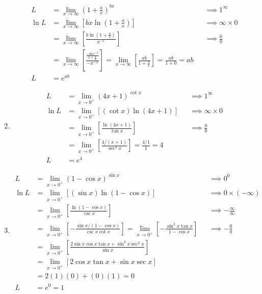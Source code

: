 \documentclass[12pt, A4]{report}
\begin{document}
\begin{enumerate}
\begin{align*}
						L &= \lim_{x\to\infty}\left(1 + \frac{a}{x}\right)^{bx}
								&&\implies 1^{\infty} \\
						\ln L &= \lim_{x\to\infty}\left[bx\ln\left(1 + \frac{a}{x}\right)\right]
								&&\implies \infty \times 0 \\
							&= \lim_{x\to\infty}\left[\frac{b\ln\left(1 + \frac{a}{x}\right)}{x^{-1}}\right]
								&&\implies \frac{0}{0} \\
							&= \lim_{x\to\infty}\left[\frac{\frac{-bax^{-2}}{1 + \frac{a}{x}}}{-x^{-2}}\right] 
								= \lim_{x\to\infty}\left[\frac{ab}{1 + \frac{a}{x}}\right] 
								= \frac{ab}{1 + 0} = ab \\
						L &= e^{ab}
					\end{align*}
				\item
					\begin{align*}
						L &= \lim_{x\to 0^+}(4x + 1)^{\cot x}
								&&\implies 1^{\infty} \\
						\ln L &= \lim_{x\to 0^+}[(\cot x)\ln(4x + 1)]
								&&\implies \infty \times 0 \\
							&= \lim_{x\to 0^+}\left[\frac{\ln(4x + 1)}{\tan x}\right]
								&&\implies \frac{0}{0} \\
							&= \lim_{x\to 0^+}\left[\frac{4/(x + 1)}{\sec^2 x}\right] 
								= \frac{4/1}{1} 
								= 4 \\
						L &= e^4
					\end{align*}
				\item
					\begin{align*}
						L &= \lim_{x\to 0^+}(1 - \cos x)^{\sin x}
								&&\implies 0^0 \\
						\ln L &= \lim_{x\to 0^+}\left[(\sin x)\ln(1 - \cos x)\right]
								&&\implies 0 \times (-\infty) \\
							&= \lim_{x\to 0^+}\left[\frac{\ln(1 - \cos x)}{\csc x}\right]
								&&\implies -\frac{\infty}{\infty} \\
							&= \lim_{x\to 0^+}\left[-\frac{\sin x /(1 - \cos x)}{\csc x \cot x}\right]
								= \lim_{x\to 0^+}\left[-\frac{\sin^2x\tan x}{1 - \cos x}\right]
								&&\implies -\frac{0}{0} \\
							&= \lim_{x\to 0^+}\left[\frac{2\sin x \cos x \tan x + \sin^2 x \sec^2 x}{\sin x}\right] \\\
							&= \lim_{x\to 0^+}[2\cos x \tan x + \sin x \sec x] \\
							&= 2(1)(0) + (0)(1) = 0 \\
						L &= e^0 
								= 1
					\end{align*}

\end{enumerate}
\end{document}
